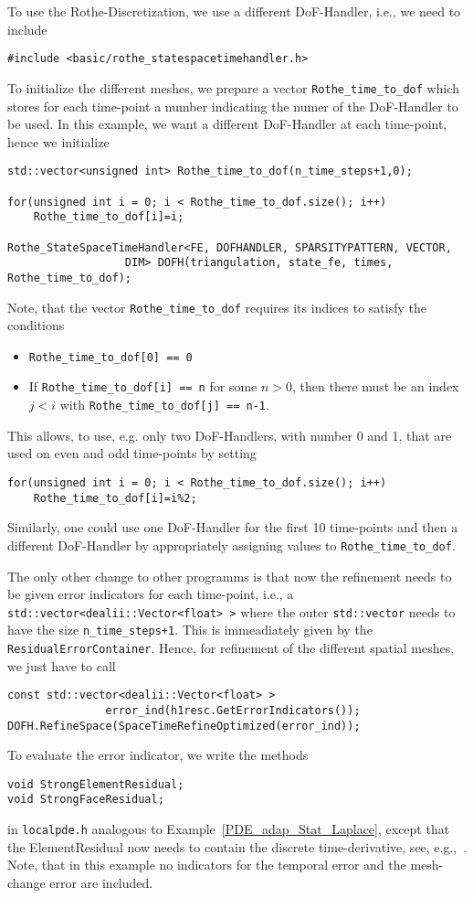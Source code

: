 To use the Rothe-Discretization, we use a different DoF-Handler, i.e.,
we need to include
\begin{verbatim}
#include <basic/rothe_statespacetimehandler.h>
\end{verbatim}
To initialize the different meshes, we prepare a vector
\texttt{Rothe\_time\_to\_dof} which stores for each time-point a number
indicating the numer of the DoF-Handler to be used. In this example,
we want a different DoF-Handler at each time-point, hence we
initialize
\begin{verbatim}
std::vector<unsigned int> Rothe_time_to_dof(n_time_steps+1,0);

for(unsigned int i = 0; i < Rothe_time_to_dof.size(); i++)
    Rothe_time_to_dof[i]=i;

Rothe_StateSpaceTimeHandler<FE, DOFHANDLER, SPARSITYPATTERN, VECTOR,
			      DIM> DOFH(triangulation, state_fe, times, Rothe_time_to_dof);
\end{verbatim}
Note, that the vector \texttt{Rothe\_time\_to\_dof} requires its indices
to satisfy the conditions
\begin{itemize}
\item \verb|Rothe_time_to_dof[0] == 0|
\item If \verb|Rothe_time_to_dof[i] == n| for some $n > 0$, then there
  must be an index $j < i$ with \verb|Rothe_time_to_dof[j] == n-1|. 
\end{itemize}
This allows, to use, e.g. only two DoF-Handlers, with number 0 and 1,
that are used on even and odd time-points by setting 
\begin{verbatim}
for(unsigned int i = 0; i < Rothe_time_to_dof.size(); i++)
    Rothe_time_to_dof[i]=i%2;
\end{verbatim}
Similarly, one could use one DoF-Handler for the first 10 time-points
and then a different DoF-Handler by appropriately assigning values to \texttt{Rothe\_time\_to\_dof}.

The only other change to other programms is that now the refinement
needs to be given error indicators for each time-point, i.e., a
\verb|std::vector<dealii::Vector<float> >| where the outer
\texttt{std::vector} needs to have the size \texttt{n\_time\_steps+1}.
This is immeadiately given by the
\texttt{ResidualErrorContainer}. Hence, for refinement of the
different spatial meshes, we just have to call
\begin{verbatim}
const std::vector<dealii::Vector<float> > 
               error_ind(h1resc.GetErrorIndicators());
DOFH.RefineSpace(SpaceTimeRefineOptimized(error_ind));
\end{verbatim}

To evaluate the error indicator, we write the methods
\begin{verbatim}
void StrongElementResidual;
void StrongFaceResidual;
\end{verbatim}
in \texttt{localpde.h} analogous to
Example~\ref{PDE_adap_Stat_Laplace},
except that the ElementResidual now needs to contain the
discrete time-derivative, see, e.g.,~\cite{Verfuehrt:2003}.
Note, that in this example no indicators for the temporal error and
the mesh-change error are included.
